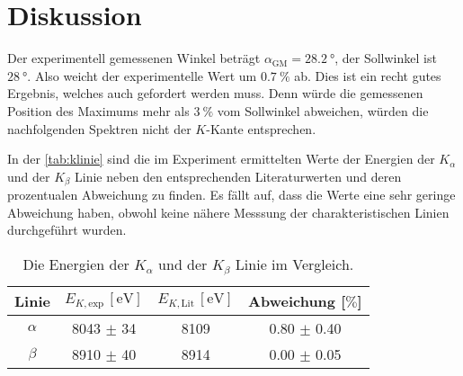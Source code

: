 \section{Diskussion}
\label{sec:Diskussion}

Der experimentell gemessenen Winkel beträgt $\alpha_{\text{GM}} = \SI{28.2}{\degree}$, der Sollwinkel ist $\SI{28}{\degree}$. 
Also weicht der experimentelle Wert um $\SI{0.7}{\percent}$ ab. Dies ist ein recht gutes Ergebnis, welches auch gefordert werden muss. Denn würde die gemessenen
Position des Maximums mehr als $\SI{3}{\percent}$ vom Sollwinkel abweichen, würden die nachfolgenden Spektren nicht der $K$-Kante entsprechen. 

\noindent
In der \autoref{tab:klinie} sind die im Experiment ermittelten Werte der Energien der $K_{\alpha}$ und der $K_{\beta}$ Linie neben den entsprechenden Literaturwerten
und deren prozentualen Abweichung zu finden. Es fällt auf, dass die Werte eine sehr geringe Abweichung haben, obwohl keine nähere Messsung der charakteristischen
Linien durchgeführt wurden.
\begin{table}
    \centering
    \caption{Die Energien der $K_{\alpha}$ und der $K_{\beta}$ Linie im Vergleich.}
    \label{tab:klinie}
    \begin{tabular}{c c c c}
        \toprule
        Linie & $E_{K, \text{exp}} \, [\si{\electronvolt}] $ & $E_{K, \text{Lit}} \, [\si{\electronvolt}]$ \cite{E_abs}  & Abweichung [$\si{\percent}$] \\
        \midrule
        $\alpha$ & 8043 $\pm$ 34 & 8109 & 0.80 $\pm$ 0.40 \\ 
        $\beta$  & 8910 $\pm$ 40 & 8914 & 0.00 $\pm$ 0.05 \\  
        \bottomrule      
    \end{tabular}
\end{table}


